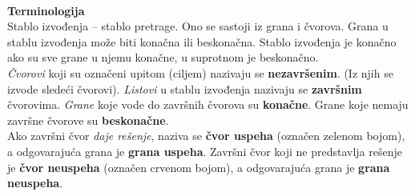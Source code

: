 \documentclass[../main.tex]{subfiles}
\begin{document}
\begin{multicols}{2}
\begin{boxprimer}
\begin{example}\\
\end{example}
\end{boxprimer}
\columnbreak
{\bf Terminologija} \\
Stablo izvođenja -- stablo pretrage. Ono se sastoji iz grana i čvorova. Grana u stablu izvođenja može biti konačna ili beskonačna. Stablo izvođenja je konačno ako su sve grane u njemu konačne, u suprotnom je beskonačno.\\
{\it Čvorovi} koji su označeni upitom (ciljem) nazivaju se {\bf nezavršenim}. (Iz njih se izvode sledeći čvorovi). {\it Listovi} u stablu izvođenja nazivaju se {\bf završnim} čvorovima. {\it Grane} koje vode do završnih čvorova su {\bf konačne}. Grane koje nemaju završne čvorove su {\bf beskonačne}. \\
Ako završni čvor {\it daje rešenje}, naziva se {\bf čvor uspeha} (označen zelenom bojom), a odgovarajuća grana je {\bf grana uspeha}. Završni čvor koji ne predstavlja rešenje je {\bf čvor neuspeha} (označen crvenom bojom), a odgovarajuća grana je {\bf grana neuspeha}.
\end{multicols}
\end{document}
